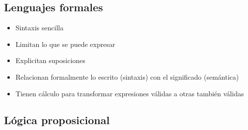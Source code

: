 \documentclass[a4paper,10pt]{article}
\begin{document}
\subsection{Lenguajes formales}
	\begin{itemize}
		\item Sintaxis sencilla
		\item Limitan lo que se puede expresar
		\item Explicitan suposiciones
		\item Relacionan formalmente lo escrito (sintaxis) con el significado (semántica)
		\item Tienen cálculo para transformar expresiones válidas a otras también válidas
	\end{itemize}
\subsection{Lógica proposicional}
\end{document}

